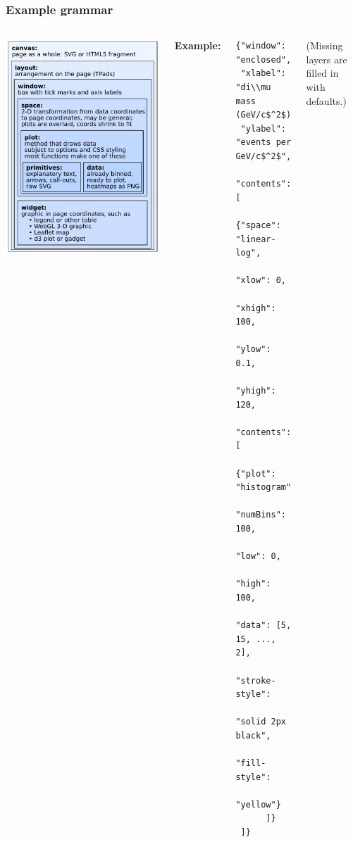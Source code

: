 \documentclass[compress]{beamer}
\begin{document}
\begin{frame}[fragile]
\frametitle{Example grammar}

\begin{columns}
\includegraphics[width=\linewidth]{layers.pdf}

{\bf Example:}

\vspace{-0.3 cm}
\scriptsize
\begin{verbatim}
{"window": "enclosed",
 "xlabel": "di\\mu mass (GeV/c$^2$)",
 "ylabel": "events per GeV/c$^2$",
 "contents": [
     {"space": "linear-log",
      "xlow": 0,
      "xhigh": 100,
      "ylow": 0.1,
      "yhigh": 120,
      "contents": [
          {"plot": "histogram",
           "numBins": 100,
           "low": 0,
           "high": 100,
           "data": [5, 15, ..., 2],
           "stroke-style":
               "solid 2px black",
           "fill-style":
               "yellow"}
      ]}
 ]}
\end{verbatim}

\vspace{-0.3 cm}
\scriptsize (Missing layers are filled in with defaults.)
\end{columns}
\end{frame}
\end{document}
